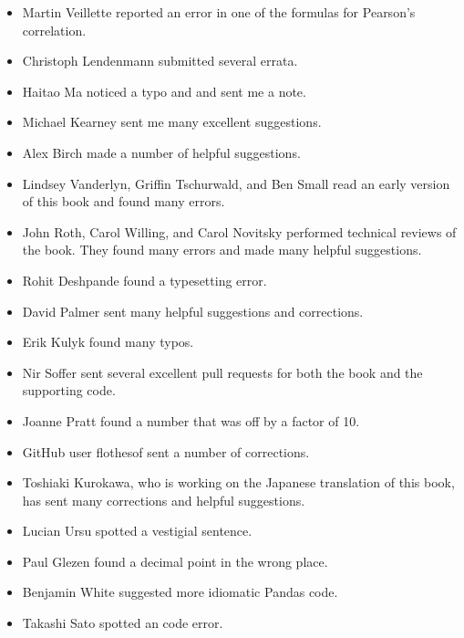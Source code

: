 \documentclass[12pt]{book}
\begin{document}
\begin{itemize}
\item Martin Veillette reported an error in one of the formulas for
Pearson's correlation.

\item Christoph Lendenmann submitted several errata.

\item Haitao Ma noticed a typo and and sent me a note.

\item Michael Kearney sent me many excellent suggestions.

\item Alex Birch made a number of helpful suggestions.

\item Lindsey Vanderlyn, Griffin Tschurwald, and Ben Small read an
  early version of this book and found many errors.

\item John Roth, Carol Willing, and Carol Novitsky performed technical
reviews of the book.  They found many errors and made many
helpful suggestions.

\item Rohit Deshpande found a typesetting error.

\item David Palmer sent many helpful suggestions and corrections.

\item Erik Kulyk found many typos.

\item Nir Soffer sent several excellent pull requests for both the
  book and the supporting code.

\item Joanne Pratt found a number that was off by a factor of 10.

\item GitHub user flothesof sent a number of corrections.

\item Toshiaki Kurokawa, who is working on the Japanese translation of
this book, has sent many corrections and helpful suggestions.

\item Lucian Ursu spotted a vestigial sentence.

\item Paul Glezen found a decimal point in the wrong place.

\item Benjamin White suggested more idiomatic Pandas code.

\item Takashi Sato spotted an code error.


\end{itemize}
\end{document}
